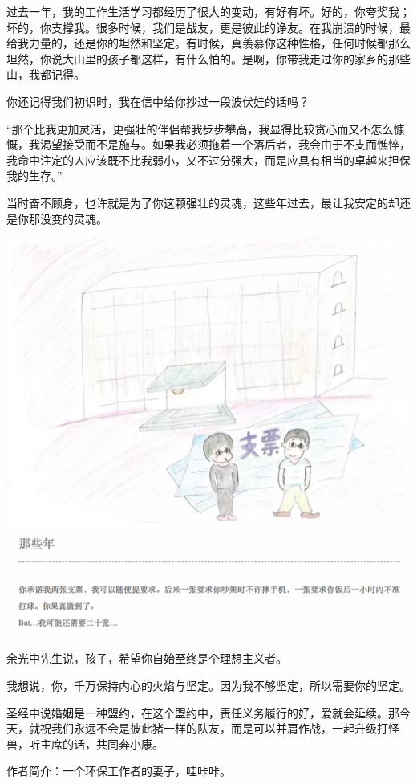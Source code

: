 \documentclass[]{book}
\begin{document}
过去一年，我的工作生活学习都经历了很大的变动，有好有坏。好的，你夸奖我；坏的，你支撑我。很多时候，我们是战友，更是彼此的诤友。在我崩溃的时候，最给我力量的，还是你的坦然和坚定。有时候，真羡慕你这种性格，任何时候都那么坦然，你说大山里的孩子都这样，有什么怕的。是啊，你带我走过你的家乡的那些山，我都记得。

你还记得我们初识时，我在信中给你抄过一段波伏娃的话吗？

``那个比我更加灵活，更强壮的伴侣帮我步步攀高，我显得比较贪心而又不怎么慷慨，我渴望接受而不是施与。如果我必须拖着一个落后者，我会由于不支而憔悴，我命中注定的人应该既不比我弱小，又不过分强大，而是应具有相当的卓越来担保我的生存。''

当时奋不顾身，也许就是为了你这颗强壮的灵魂，这些年过去，最让我安定的却还是你那没变的灵魂。

\includegraphics[width=8.33in]{images/wife5}

余光中先生说，孩子，希望你自始至终是个理想主义者。

我想说，你，千万保持内心的火焰与坚定。因为我不够坚定，所以需要你的坚定。

圣经中说婚姻是一种盟约，在这个盟约中，责任义务履行的好，爱就会延续。那今天，就祝我们永远不会是彼此猪一样的队友，而是可以并肩作战，一起升级打怪兽，听主席的话，共同奔小康。

作者简介：一个环保工作者的妻子，哇咔咔。
\end{document}
